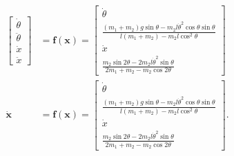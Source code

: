 \documentclass{article}
\renewcommand{\vec}[1]{\boldsymbol{\mathbf{#1}}}
\newcommand{\dvec}[1]{\dot{\vec{#1}}}
\begin{document}
\begin{align*}
\begin{bmatrix}
    \dot{\theta}  \\
    \ddot{\theta} \\
    \dot{x}       \\
    \ddot{x}
  \end{bmatrix} & = \vec{f}(\vec{x}) = \begin{bmatrix}
                                         \dot{\theta}                                                                                                         \\
                                         \frac{(m_1 + m_2) g \sin \theta - m_2 l \dot{\theta}^2 \cos \theta \sin \theta}{l (m_1 + m_2) - m_2 l \cos^2 \theta} \\
                                         \dot{x}                                                                                                              \\
                                         \frac{m_2 \sin 2 \theta - 2 m_2 l \dot{\theta}^2 \sin \theta}{2 m_1 + m_2 - m_2 \cos 2 \theta}
                                       \end{bmatrix}    \\
  \dvec{x}         & = \vec{f}(\vec{x}) = \begin{bmatrix}
                                            \dot{\theta}                                                                                                         \\
                                            \frac{(m_1 + m_2) g \sin \theta - m_2 l \dot{\theta}^2 \cos \theta \sin \theta}{l (m_1 + m_2) - m_2 l \cos^2 \theta} \\
                                            \dot{x}                                                                                                              \\
                                            \frac{m_2 \sin 2 \theta - 2 m_2 l \dot{\theta}^2 \sin \theta}{2 m_1 + m_2 - m_2 \cos 2 \theta}
                                          \end{bmatrix}.
\end{align*}
\end{document}

